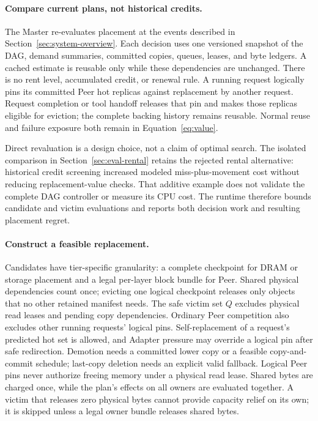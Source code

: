 \paragraph{Compare current plans, not historical credits.}
The Master re-evaluates placement at the events described in
Section~\ref{sec:system-overview}. Each decision uses one versioned snapshot
of the DAG, demand summaries, committed copies, queues, leases, and byte
ledgers. A cached estimate is reusable only while these dependencies are
unchanged. There is no rent level, accumulated credit, or renewal rule.
A running request logically pins its committed Peer hot replicas against
replacement by another request. Request completion or tool handoff releases
that pin and makes those replicas eligible for eviction; the complete
backing history remains reusable. Normal reuse and failure exposure
both remain in Equation~\ref{eq:value}.

Direct revaluation is a design choice, not a claim of optimal search.
The isolated comparison in Section~\ref{sec:eval-rental} retains the
rejected rental alternative: historical credit screening increased
modeled miss-plus-movement cost without reducing replacement-value checks.
That additive example does not validate the complete DAG controller or
measure its CPU cost. The runtime therefore bounds candidate and victim
evaluations and reports both decision work and resulting placement regret.

\paragraph{Construct a feasible replacement.}
Candidates have tier-specific granularity: a complete checkpoint for
DRAM or storage placement and a legal per-layer block bundle for Peer.
Shared physical dependencies count once; evicting one logical checkpoint
releases only objects that no other retained manifest needs. The safe
victim set $Q$ excludes physical read leases and pending copy dependencies.
Ordinary Peer competition also excludes other running requests' logical
pins. Self-replacement of a request's predicted hot set is allowed, and
Adapter pressure may override a logical pin after safe redirection. Demotion needs a committed lower copy or a
feasible copy-and-commit schedule; last-copy deletion needs an explicit
valid fallback. Logical Peer pins never authorize freeing memory under a physical read lease. Shared bytes are charged once, while
the plan's effects on all owners are evaluated together. A victim that
releases zero physical bytes cannot provide capacity relief on its own;
it is skipped unless a legal owner bundle releases shared bytes.

